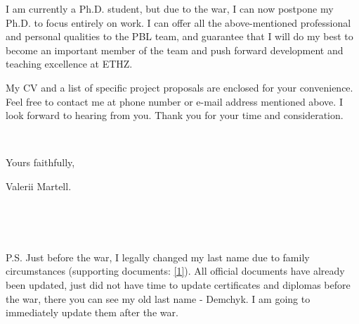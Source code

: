 \documentclass{martell_cv}
\begin{document}
{I am currently a Ph.D. student, but due to the war, I can now postpone my Ph.D. to focus entirely on work. I can offer all the above-mentioned professional and personal qualities to the PBL team, and guarantee that I will do my best to become an important member of the team and push forward development and teaching excellence at ETHZ. 

My CV and a list of specific project proposals are enclosed for your convenience. Feel free to contact me at phone number or e-mail address mentioned above. I look forward to hearing from you. Thank you for your time and consideration.
\par \ \ \par
Yours faithfully,\par 
Valerii Martell.\par \ \ \par \ \ 
\par P.S. Just before the war, I legally changed my last name due to family circumstances (supporting documents: \href{https://drive.google.com/drive/folders/1OXNxW5fuXCGw8zo44h5djY0wQFQ2tmv9?usp=sharing}{[1]}). All official documents have already been updated, just did not have time to update certificates and diplomas before the war, there you can see my old last name - Demchyk. I am going to immediately update them after the war.
}
\createfootnote
\end{document}
